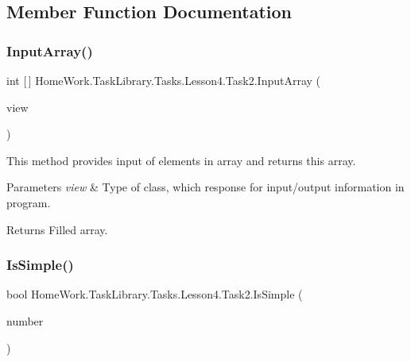 \subsection{Member Function Documentation}
\mbox{\label{class_home_work_1_1_task_library_1_1_tasks_1_1_lesson4_1_1_task2_a6dea6a693b3aab1b494ddfc03b919a57}} 
\subsubsection{\texorpdfstring{InputArray()}{InputArray()}}
{\footnotesize\ttfamily int \mbox{[}$\,$\mbox{]} Home\+Work.\+Task\+Library.\+Tasks.\+Lesson4.\+Task2.\+Input\+Array (\begin{DoxyParamCaption}\item[{I\+Information}]{view }\end{DoxyParamCaption})\hspace{0.3cm}{\ttfamily [private]}}



This method provides input of elements in array and returns this array. 


\begin{DoxyParams}{Parameters}
{\em view} & Type of class, which response for input/output information in program.\\
\hline
\end{DoxyParams}
\begin{DoxyReturn}{Returns}
Filled array.
\end{DoxyReturn}
\mbox{\label{class_home_work_1_1_task_library_1_1_tasks_1_1_lesson4_1_1_task2_a48fcc044b17cfbb8747671cae85fbd98}} 
\subsubsection{\texorpdfstring{IsSimple()}{IsSimple()}}
{\footnotesize\ttfamily bool Home\+Work.\+Task\+Library.\+Tasks.\+Lesson4.\+Task2.\+Is\+Simple (\begin{DoxyParamCaption}\item[{int}]{number }\end{DoxyParamCaption})\hspace{0.3cm}{\ttfamily [private]}}



